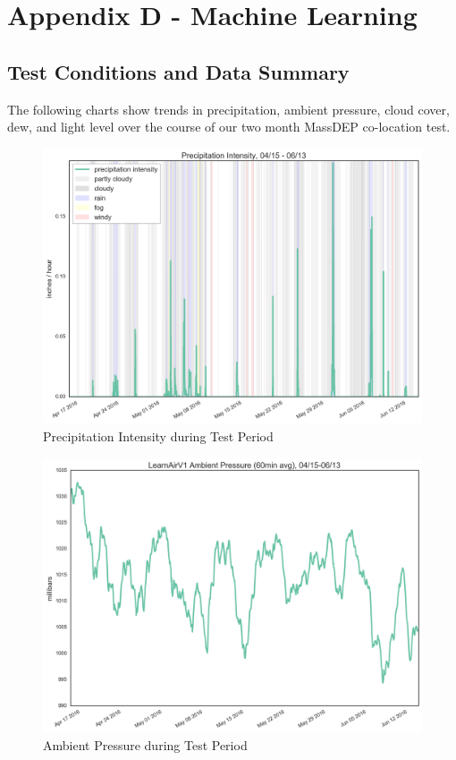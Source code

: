 \chapter{Appendix D - Machine Learning}

\section{Test Conditions and Data Summary}
\FloatBarrier

The following charts show trends in precipitation, ambient pressure, cloud cover, dew, and light level over the course of our two month MassDEP co-location test.

\begin{figure}[htb]
 	\includegraphics[width=\textwidth]{figs/precip_intensity}               
 	 \caption{Precipitation Intensity during Test Period}
  	\label{fig:precip_intensity}
\end{figure}

\begin{figure}[htb]
 	\includegraphics[width=\textwidth]{figs/ambient_pressure}               
 	 \caption{Ambient Pressure during Test Period}
  	\label{fig:ambient_pressure}
\end{figure}

